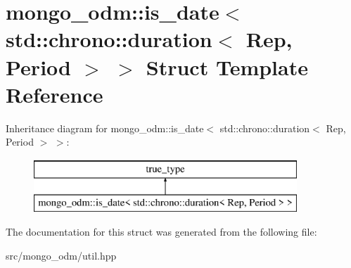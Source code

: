 \hypertarget{structmongo__odm_1_1is__date_3_01std_1_1chrono_1_1duration_3_01Rep_00_01Period_01_4_01_4}{}\section{mongo\+\_\+odm\+:\+:is\+\_\+date$<$ std\+:\+:chrono\+:\+:duration$<$ Rep, Period $>$ $>$ Struct Template Reference}
\label{structmongo__odm_1_1is__date_3_01std_1_1chrono_1_1duration_3_01Rep_00_01Period_01_4_01_4}
Inheritance diagram for mongo\+\_\+odm\+:\+:is\+\_\+date$<$ std\+:\+:chrono\+:\+:duration$<$ Rep, Period $>$ $>$\+:\begin{figure}[H]
\begin{center}
\leavevmode
\includegraphics[height=2.000000cm]{structmongo__odm_1_1is__date_3_01std_1_1chrono_1_1duration_3_01Rep_00_01Period_01_4_01_4}
\end{center}
\end{figure}


The documentation for this struct was generated from the following file\+:\begin{DoxyCompactItemize}
\item 
src/mongo\+\_\+odm/util.\+hpp\end{DoxyCompactItemize}
